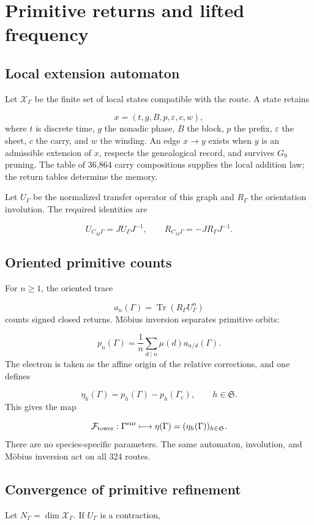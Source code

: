 \section{Primitive returns and lifted frequency}
\subsection{Local extension automaton}
Let \(\mathscr X_\Gamma\) be the finite set of local states compatible with the route. A state retains

\[
 x=(t,g,B,p,\varepsilon,c,w),
\]
where \(t\) is discrete time, \(g\) the nonadic phase, \(B\) the block, \(p\) the prefix, \(\varepsilon\) the sheet, \(c\) the carry, and \(w\) the winding. An edge \(x\to y\) exists when \(y\) is an admissible extension of \(x\), respects the genealogical record, and survives \(G_9\) pruning. The table of 36,864 carry compositions supplies the local addition law; the return tables determine the memory.

Let \(U_\Gamma\) be the normalized transfer operator of this graph and \(R_\Gamma\) the orientation involution. The required identities are

\[
 U_{C_M\Gamma}=J U_\Gamma J^{-1},\qquad
 R_{C_M\Gamma}=-J R_\Gamma J^{-1}.
\]
\subsection{Oriented primitive counts}
For \(n\ge1\), the oriented trace

\[
 a_n(\Gamma)=\operatorname{Tr}(R_\Gamma U_\Gamma^n)
\]
counts signed closed returns. Möbius inversion separates primitive orbits:

\[
 p_n(\Gamma)
 =\frac1n\sum_{d\mid n}\mu(d)a_{n/d}(\Gamma).
\]
The electron is taken as the affine origin of the relative corrections, and one defines

\[
 \boxed{
 \eta_h(\Gamma)=p_h(\Gamma)-p_h(\Gamma_e),
 \qquad h\in\mathfrak S.}
\]
This gives the map

\[
 \mathcal F_{\rm tower}:
 \Gamma^{\rm enr}\longmapsto
 \eta(\Gamma)=(\eta_h(\Gamma))_{h\in\mathfrak S}.
\]
There are no species-specific parameters. The same automaton, involution, and Möbius inversion act on all 324 routes.

\subsection{Convergence of primitive refinement}
Let \(N_\Gamma=\dim\mathscr X_\Gamma\). If \(U_\Gamma\) is a contraction,

